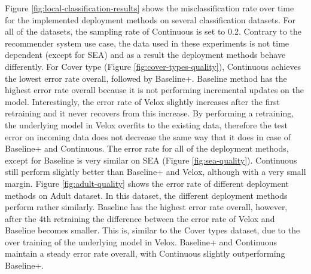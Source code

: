 \documentclass{vldb}
\begin{document}
Figure \ref{fig:local-classification-results} shows the misclassification rate over time for the implemented deployment methods on several classification datasets.
For all of the datasets, the sampling rate of Continuous is set to 0.2.
Contrary to the recommender system use case, the data used in these experiments is not time dependent (except for SEA) and as a result the deployment methods behave differently.
For Cover type (Figure \ref{fig:cover-types-quality}), Continuous achieves the lowest error rate overall, followed by Baseline+.
Baseline method has the highest error rate overall because it is not performing incremental updates on the model.
Interestingly, the error rate of Velox slightly increases after the first retraining and it never recovers from this increase.
By performing a retraining, the underlying model in Velox overfits to the existing data, therefore the test error on incoming data does not decrease the same way that it does in case of Baseline+ and Continuous.
The error rate for all of the deployment methods, except for Baseline is very similar on SEA (Figure \ref{fig:sea-quality}).
Continuous still perform slightly better than Baseline+ and Velox, although with a very small margin.
Figure \ref{fig:adult-quality} shows the error rate of different deployment methods on Adult dataset.
In this dataset, the different deployment methods perform rather similarly.
Baseline has the highest error rate overall, however, after the 4th retraining the difference between the error rate of Velox and Baseline becomes smaller.
This is, similar to the Cover types dataset, due to the over training of the underlying model in Velox.
Baseline+ and Continuous maintain a steady error rate overall, with Continuous slightly outperforming Baseline+.
\end{document}
